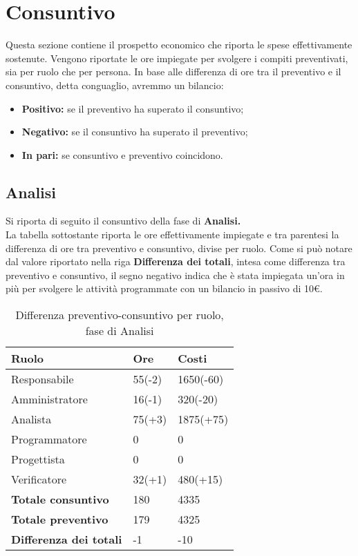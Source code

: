 \section{Consuntivo}
Questa sezione contiene il prospetto economico che riporta le spese effettivamente sostenute. Vengono riportate le ore impiegate per svolgere i compiti preventivati, sia per
ruolo che per persona. In base alle differenza di ore tra il preventivo e il consuntivo, detta conguaglio, avremmo un bilancio:
\begin{itemize}
\item \textbf{Positivo:} se il preventivo ha superato il consuntivo;
\item \textbf{Negativo:} se il consuntivo ha superato il preventivo;
\item \textbf{In pari:} se consuntivo e preventivo coincidono.
\end{itemize}

\subsection{Analisi}

Si riporta di seguito il consuntivo della fase di \textbf{Analisi.}\\
La tabella sottostante riporta le ore effettivamente impiegate e tra parentesi la differenza di ore tra preventivo e consuntivo, divise per ruolo. Come si può notare dal valore riportato nella riga \textbf{Differenza dei totali}, intesa come differenza tra preventivo e consuntivo, il segno negativo indica che è stata impiegata un'ora in più per svolgere le attività programmate con un bilancio in passivo di 10\euro.

	\begin{table}[H]
		\centering
	  \begin{tabular}{p{}p{}
		    							p{}}
		   \toprule Ruolo & Ore & Costi \\
		   \midrule
		   Responsabile & 55(-2) & 1650(-60) \\
		   Amministratore & 16(-1) & 320(-20) \\
		   Analista & 75(+3) & 1875(+75) \\
		   Programmatore & 0 & 0 \\
		   Progettista & 0 & 0 \\
		   Verificatore & 32(+1) & 480(+15) \\
		   \hline
		   \textbf{Totale consuntivo} & 180 & 4335 \\
		   \textbf{Totale preventivo} & 179 & 4325 \\
		   \textbf{Differenza dei totali} & -1 & -10 \\
		   \bottomrule
	 \end{tabular}
	 	\label{tab:costuntivoRequisiti}
	 	\caption{Differenza preventivo-consuntivo per ruolo, fase di Analisi}
	\end{table}

